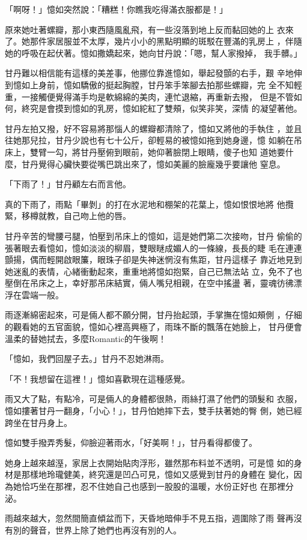 「啊呀！」憶如突然說：「糟糕！你瞧我吃得滿衣服都是！」

原來她吐著螺瓣，那小東西隨風亂飛，有一些沒落到地上反而黏回她的上
衣來了。她那件家居服並不太厚，幾片小小的黑點明顯的斑駁在豐滿的乳房上
，伴隨她的呼吸在起伏著。憶如撒嬌起來，她向甘丹說：「嗯，幫人家撥掉，
我手髒。」

甘丹難以相信能有這樣的美差事，他挪位靠進憶如，舉起發顫的右手，艱
辛地伸到憶如上身前，憶如驕傲的挺起胸膛，甘丹笨手笨腳去拍那些螺瓣，完
全不知輕重，一接觸便覺得滿手均是軟綿綿的美肉，連忙退縮，再重新去撥，
但是不管如何，終究是會摸到憶如的乳房，憶如紽紅了雙頰，似笑非笑，深情
的凝望著他。

甘丹左拍又撥，好不容易將那惱人的螺瓣都清除了，憶如又將他的手執住
，並且往她那兒拉，甘丹少說也有七十公斤，卻輕易的被憶如拖到她身邊，憶
如躺在吊床上，雙臂一勾，將甘丹壓俯到眼前，她仰著臉閉上眼睛，傻子也知
道她要什麼，甘丹覺得心臟快要從嘴巴跳出來了，憶如美麗的臉龐幾乎要讓他
窒息。

「下雨了！」甘丹顧左右而言他。

真的下雨了，雨點「畢剝」的打在水泥地和棚架的花葉上，憶如恨恨地將
他攬緊，移樽就教，自己吻上他的唇。

甘丹辛苦的彎腰弓腿，怕壓到吊床上的憶如，這是她們第二次接吻，甘丹
偷偷的張著眼去看憶如，憶如淡淡的柳眉，雙眼瞇成媚人的一條線，長長的睫
毛在連連顫揚，偶而輕開啟眼簾，眼珠子卻是失神迷惘沒有焦距，甘丹這樣子
靠近地見到她迷亂的表情，心緒衝動起來，重重地將憶如抱緊，自己已無法站
立，免不了也壓倒在吊床之上，幸好那吊床結實，倆人嘴兒相親，在空中搖盪
著，靈魂彷彿漂浮在雲端一般。

雨逐漸綿密起來，可是倆人都不願分開，甘丹抬起頭，手掌撫在憶如頰側
，仔細的觀看她的五官面貌，憶如心裡高興極了，雨珠不斷的飄落在她臉上，
甘丹便會溫柔的替她拭去，多麼Romantic的午後啊！

「憶如，我們回屋子去。」甘丹不忍她淋雨。

「不！我想留在這裡！」憶如喜歡現在這種感覺。

雨又大了點，有點冷，可是倆人的身體都很熱，雨絲打濕了他們的頭髮和
衣服，憶如摟著甘丹一翻身，「小心！」，甘丹怕她摔下去，雙手扶著她的臀
側，她已經跨坐在甘丹身上。

憶如雙手撥弄秀髮，仰臉迎著雨水，「好美啊！」，甘丹看得都傻了。

她身上越來越溼，家居上衣開始貼肉浮形，雖然那布料並不透明，可是憶
如的身材是那樣地玲瓏健美，終究還是凹凸可見，憶如又感覺到甘丹的身體在
變化，因為她恰巧坐在那裡，忍不住她自己也感到一股股的溫暖，水份正好也
在那裡分泌。

雨越來越大，忽然間簡直傾盆而下，天昏地暗伸手不見五指，週圍除了雨
聲再沒有別的聲音，世界上除了她們也再沒有別的人。

